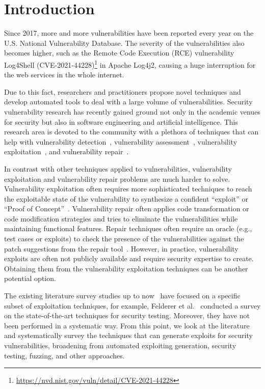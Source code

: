 \section{Introduction}
\label{sec:intro}
Since 2017, more and more vulnerabilities have been reported every year on the U.S. National Vulnerability Database. The severity of the vulnerabilities also becomes higher, such as the Remote Code Execution (RCE) vulnerability Log4Shell (CVE-2021-44228)\footnote{\url{https://nvd.nist.gov/vuln/detail/CVE-2021-44228}} in Apache Log4j2, causing a huge interruption for the web services in the whole internet.%

Due to this fact, researchers and practitioners propose novel techniques and develop automated tools to deal with a large volume of vulnerabilities. Security vulnerability research has recently gained ground not only in the academic venues for security but also in software engineering and artificial intelligence. This research area is devoted to the community with a plethora of techniques that can help with vulnerability detection~\cite{scandariato2014predicting, li2018vuldeepecker, chakraborty2021deep, fu2022linevul}, vulnerability assessment~\cite{le2021deepcva, upadhyay2020scada, han2017learning, du2019leopard}, vulnerability exploitation~\cite{iannone2021toward, avgerinos2014automatic, brumley2008automatic}, and vulnerability repair~\cite{pearce2023examining, fu2022vulrepair, bui2024apr4vul}.

In contrast with other techniques applied to vulnerabilities, vulnerability exploitation and vulnerability repair problems are much harder to solve. Vulnerability exploitation often requires more sophisticated techniques to reach the exploitable state of the vulnerability to synthesize a confident ``exploit'' or ``Proof of Concept''~\cite{avgerinos2014automatic}. Vulnerability repair often applies code transformation or code modification strategies and tries to eliminate the vulnerabilities while maintaining functional features. Repair techniques often require an oracle (e.g., test cases or exploits) to check the presence of the vulnerabilities against the patch suggestions from the repair tool~\cite{monperrus2018automatic}. However, in practice, vulnerability exploits are often not publicly available and require security expertise to create. Obtaining them from the vulnerability exploitation techniques can be another potential option.

The existing literature survey studies up to now~\cite{shahriar2009automatic, felderer2016model, felderer2016security, aydos2022security, sommer2023survey, ahsan2024systematic} have focused on a specific subset of exploitation techniques, for example, Felderer et al.~\cite{felderer2016security} conducted a survey on the state-of-the-art techniques for security testing. Moreover, they have not been performed in a systematic way. From this point, we look at the literature and systematically survey the techniques that can generate exploits for security vulnerabilities, broadening from automated exploiting generation, security testing, fuzzing, and other approaches.

